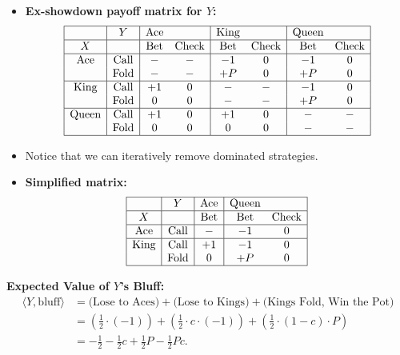 \documentclass[12pt]{article}
\begin{document}
\begin{itemize}
    \item \textbf{Ex-showdown payoff matrix for \( Y \):}
    \[
    \begin{array}{|c|c|cc|cc|cc|}
    \hline
    & Y & \text{Ace} &  & \text{King} &  & \text{Queen} & \\
    \hline
    X & & \text{Bet} & \text{Check} & \text{Bet} & \text{Check} & \text{Bet} & \text{Check} \\
    \hline
    \text{Ace} & \text{Call} & - & - & -1 & 0 & -1 & 0 \\
    & \text{Fold} & - & - & +P & 0 & +P & 0 \\
    \hline
    \text{King} & \text{Call} & +1 & 0 & - & - & -1 & 0 \\
    & \text{Fold} & 0 & 0 & - & - & +P & 0 \\
    \hline
    \text{Queen} & \text{Call} & +1 & 0 & +1 & 0 & - & - \\
    & \text{Fold} & 0 & 0 & 0 & 0 & - & - \\
    \hline
    \end{array}
    \]

    \item Notice that we can iteratively remove dominated strategies.
    
    \item \textbf{Simplified matrix:}
    \[
    \begin{array}{|c|c|c|c c|}
    \hline
         & Y & \text{Ace} & \text{Queen} &\\
    \hline
       X  & & \text{Bet} & \text{Bet} & \text{Check} \\
    \hline
       \text{Ace} & \text{Call} & - & -1 & 0 \\
    \hline
        \text{King} & \text{Call} & +1 & -1 & 0 \\
        & \text{Fold} & 0 & +P & 0 \\
    \hline
    \end{array}
    \]
\end{itemize}

\noindent\textbf{Expected Value of \( Y \)'s Bluff:}
\begin{align*}
    \langle Y, \text{bluff} \rangle &= \text{(Lose to Aces)} + \text{(Lose to Kings)} + \text{(Kings Fold, Win the Pot)} \\
    &= \left(\frac{1}{2} \cdot (-1)\right) + \left(\frac{1}{2} \cdot c \cdot (-1)\right) + \left(\frac{1}{2} \cdot (1 - c) \cdot P\right) \\
    &= -\frac{1}{2} - \frac{1}{2}c + \frac{1}{2}P - \frac{1}{2}Pc.
\end{align*}
\end{document}

